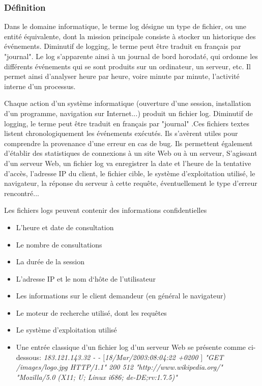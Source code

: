 \subsubsection{Définition}
Dans le domaine informatique, le terme log désigne un type de fichier, ou une entité équivalente, dont la mission principale consiste à stocker un historique des événements. Diminutif de logging, le terme peut être traduit en français par "journal". Le log s'apparente ainsi à un journal de bord horodaté, qui ordonne les différents événements qui se sont produits sur un ordinateur, un serveur, etc. Il permet ainsi d'analyser heure par heure, voire minute par minute, l'activité interne d'un processus.


Chaque action d'un système informatique (ouverture d'une session, installation d'un programme, navigation sur Internet...) produit un fichier log. Diminutif de logging, le terme peut être traduit en français par "journal" .Ces fichiers textes listent chronologiquement les événements exécutés. Ils s'avèrent utiles pour comprendre la provenance d'une erreur en cas de bug.
Ils permettent également d'établir des statistiques de connexions à un site Web ou à un serveur,
S'agissant d'un serveur Web, un fichier log va enregistrer la date et l'heure de la tentative d'accès, l'adresse IP du client, le fichier cible, le système d'exploitation utilisé, le navigateur, la réponse du serveur à cette requête, éventuellement le type d'erreur rencontré...

Les fichiers logs peuvent contenir des informations confidentielles

\begin{itemize}
	\item L’heure et date de consultation
	\item Le nombre de consultations
	\item La durée de la session
	\item L’adresse IP et le nom d‘hôte de l’utilisateur
	\item Les informations sur le client demandeur (en général le navigateur)
	\item Le moteur de recherche utilisé, dont les requêtes
	\item Le système d’exploitation utilisé
	\item Une entrée classique d’un fichier log d’un serveur Web se présente comme ci-dessous: \textit{183.121.143.32 - - $ [ $18/Mar/2003:08:04:22 +0200 $ ] $ "GET /images/logo.jpg HTTP/1.1" 200 512 "http://www.wikipedia.org/" "Mozilla/5.0 (X11; U; Linux i686; de-DE;rv:1.7.5)"}
\end{itemize}
